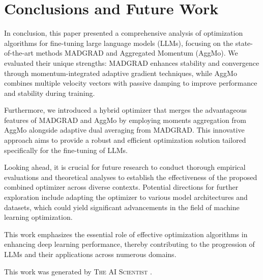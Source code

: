 \documentclass{article} %
\begin{document}
\section{Conclusions and Future Work}
\label{sec:conclusion}
\begin{flushleft}
In conclusion, this paper presented a comprehensive analysis of optimization algorithms for fine-tuning large language models (LLMs), focusing on the state-of-the-art methods MADGRAD and Aggregated Momentum (AggMo). We evaluated their unique strengths: MADGRAD enhances stability and convergence through momentum-integrated adaptive gradient techniques, while AggMo combines multiple velocity vectors with passive damping to improve performance and stability during training.

Furthermore, we introduced a hybrid optimizer that merges the advantageous features of MADGRAD and AggMo by employing moments aggregation from AggMo alongside adaptive dual averaging from MADGRAD. This innovative approach aims to provide a robust and efficient optimization solution tailored specifically for the fine-tuning of LLMs.

Looking ahead, it is crucial for future research to conduct thorough empirical evaluations and theoretical analyses to establish the effectiveness of the proposed combined optimizer across diverse contexts. Potential directions for further exploration include adapting the optimizer to various model architectures and datasets, which could yield significant advancements in the field of machine learning optimization.

This work emphasizes the essential role of effective optimization algorithms in enhancing deep learning performance, thereby contributing to the progression of LLMs and their applications across numerous domains.
\end{flushleft}

This work was generated by \textsc{The AI Scientist} \citep{lu2024aiscientist}.



\end{document}

